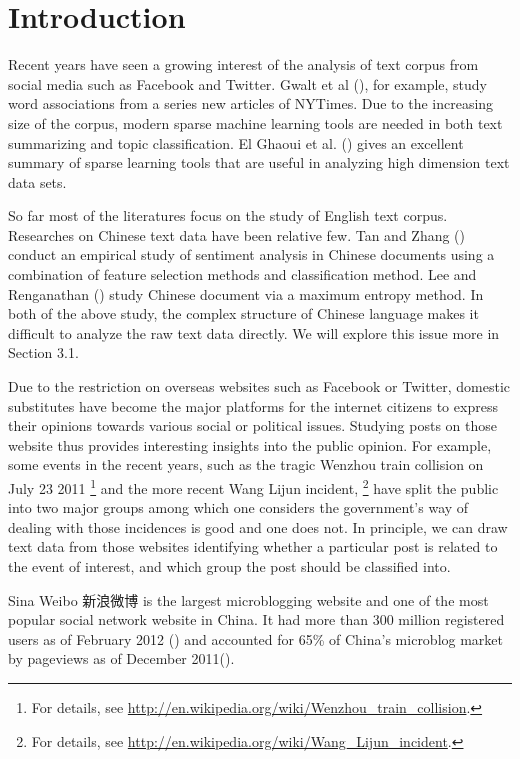 \documentclass[11pt]{article}
\newcommand{\1}[1]{{\mathbf 1}\left\{#1\right\}}        %
\begin{document}
\section{Introduction}

Recent years have seen a growing interest of the analysis of text corpus from social media such as Facebook and Twitter. Gwalt et al (\cite{gawalt2010discovering}), for example, study word associations from a series new articles of NYTimes. Due to the increasing size of the corpus, modern sparse machine learning tools are needed in both text summarizing and topic classification. El Ghaoui et al. (\cite{ELDPSB:11}) gives an excellent summary of sparse learning tools that are useful in analyzing high dimension text data sets.  


So far most of the literatures focus on the study of English text corpus. Researches on Chinese text data have been relative few. Tan and Zhang (\cite{tan2008empirical}) conduct an empirical study of sentiment analysis in Chinese documents using a combination of feature selection methods and classification method. Lee and Renganathan (\cite{lee2011chinese}) study Chinese document via a maximum entropy method. In both of the above study, the complex structure of Chinese language makes it difficult to analyze the raw text data directly. We will explore this issue more in Section 3.1. 


Due to the restriction on overseas websites such as Facebook or Twitter, domestic substitutes have become the major platforms for the internet citizens to express their opinions towards various social or political issues. Studying posts on those website thus provides interesting insights into the public opinion. For example, some events in the recent years, such as the tragic Wenzhou train collision on July 23 2011
\footnote{For details, see \url{http://en.wikipedia.org/wiki/Wenzhou_train_collision}. }
  and the more recent Wang Lijun incident,
\footnote{For details, see \url{http://en.wikipedia.org/wiki/Wang_Lijun_incident}.}  
have split the public into two major groups among which one considers the government's way of dealing with those incidences is good and one does not. 
In principle, we can draw text data from those websites identifying whether a particular post is related to the event of interest, and which group the post should be classified into.

Sina Weibo 新浪微博 is the largest microblogging website and one of the most popular social network website in China. It had more than 300 million registered users as of February 2012 (\cite{bloombergSina})
and accounted for 65\% of China's microblog market by pageviews as of December 2011(\cite{WashingtonPostSina}).
\end{document}

